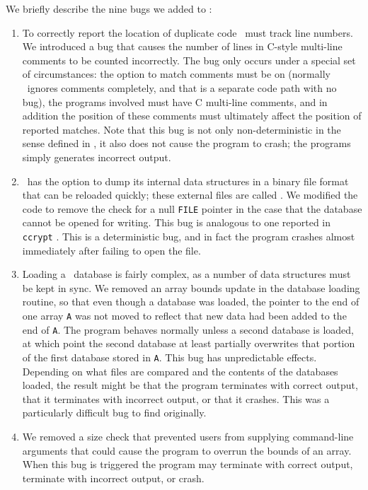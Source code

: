 We briefly describe the nine bugs we added to \moss:
\begin{enumerate}
\item To correctly report the location of duplicate code \moss\ must
track line numbers.  We introduced a bug that causes the number of
lines in C-style multi-line comments to be counted incorrectly.  The
bug only occurs under a special set of circumstances: the option to
match comments must be on (normally \moss\ ignores comments
completely, and that is a separate code path with no bug), the
programs involved must have C multi-line comments, and in addition the
position of these comments must ultimately affect the position of
reported matches.  Note that this bug is not only non-deterministic in
the sense defined in , it also does not
cause the program to crash; the programs simply generates incorrect
output.

\item \moss\ has the option to dump its internal data structures in a
binary file format that can be reloaded quickly; these external files
are called .  We modified the code to remove the check for a
null {\tt FILE} pointer in the case that the database cannot be opened
for writing.  This bug is analogous to one reported in {\tt ccrypt}
\cite{Selinger:2003:cqual}.  This is a deterministic bug, and in fact the
program crashes almost immediately after failing to open the file.

\item Loading a \moss\ database is fairly complex, as a number of data
structures must be kept in sync.  We removed an array bounds update
in the database loading routine, so that even though a database was
loaded, the pointer to the end of one array {\tt A} was not moved to
reflect that new data had been added to the end of {\tt A}. The
program behaves normally unless a second database is loaded, at which
point the second database at least partially overwrites that portion
of the first database stored in {\tt A}.  This bug has unpredictable
effects.  Depending on what files are compared and the contents of the
databases loaded, the result might be that the program terminates with
correct output, that it terminates with incorrect output, or that it
crashes.  This was a particularly difficult bug to find originally.

\item We removed a size check that prevented users from supplying command-line arguments
that could cause the program to overrun the bounds of an array.  When
this bug is triggered the program may terminate with correct output,
terminate with incorrect output, or crash.



\end{enumerate}
